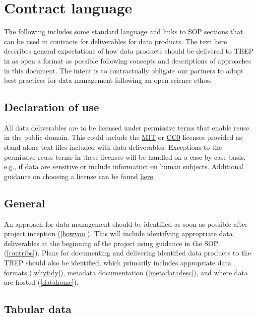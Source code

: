 \documentclass[
]{book}
\begin{document}
\hypertarget{contract-language}{%
\section{Contract language}\label{contract-language}}

The following includes some standard language and links to SOP sections that can be used in contracts for deliverables for data products. The text here describes general expectations of how data products should be delivered to TBEP in as open a format as possible following concepts and descriptions of approaches in this document. The intent is to contractually obligate our partners to adopt best practices for data management following an open science ethos.

\hypertarget{declaration-of-use}{%
\subsection{Declaration of use}\label{declaration-of-use}}

All data deliverables are to be licensed under permissive terms that enable reuse in the public domain. This could include the \href{https://choosealicense.com/licenses/mit/}{MIT} or \href{https://choosealicense.com/licenses/cc0-1.0/}{CC0} licenses provided as stand-alone text files included with data deliverables. Exceptions to the permissive reuse terms in these licenses will be handled on a case by case basis, e.g., if data are sensitive or include information on human subjects. Additional guidance on choosing a license can be found \href{https://choosealicense.com/}{here}.

\hypertarget{general}{%
\subsection{General}\label{general}}

An approach for data management should be identified as soon as possible after project inception (\ref{howyou}). This will include identifying appropriate data deliverables at the beginning of the project using guidance in the SOP (\ref{contribs}). Plans for documenting and delivering identified data products to the TBEP should also be identified, which primarily includes appropriate data formats (\ref{whytidy}), metadata documentation (\ref{metadatadesc}), and where data are hosted (\ref{datahome}).

\hypertarget{tabular-data}{%
\subsection{Tabular data}\label{tabular-data}}
\end{document}
